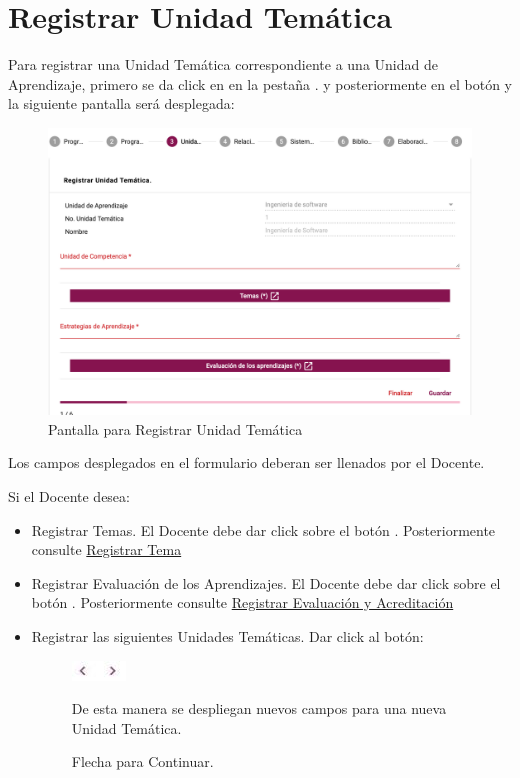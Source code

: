 \section{Registrar Unidad Temática}

Para registrar una Unidad Temática  correspondiente a una Unidad de Aprendizaje, primero se da click en en la pestaña . y posteriormente en el botón  y la siguiente pantalla será desplegada:

\hypertarget{RUT}{\begin{figure}[!h]
    \centering
    \hypertarget{9}{\includegraphics[width=0.5\linewidth]{images/SP6/RegistrarUT.png}}
    \caption{Pantalla para Registrar Unidad Temática}
\end{figure}
}


Los campos desplegados en el formulario deberan ser llenados por el Docente.

Si el Docente desea:

\begin{itemize}
    \item Registrar Temas. El Docente debe dar click sobre el botón . Posteriormente consulte \hyperlink{RegistrarTema}{Registrar Tema}
    \item Registrar Evaluación de los Aprendizajes. El Docente debe dar click sobre el botón . Posteriormente consulte \hyperlink{RegistrarEvalAprend}{Registrar Evaluación y Acreditación}
    \item Registrar las siguientes Unidades Temáticas. Dar click al botón:
    \begin{figure}[!hbtp]
    \centering
    \includegraphics[width=0.05\linewidth]{images/SP6/Flecha}
    \caption{Flecha para Continuar.} 
    
    De esta manera se despliegan nuevos campos para una nueva Unidad Temática. 
\end{figure}
    
\end{itemize}

